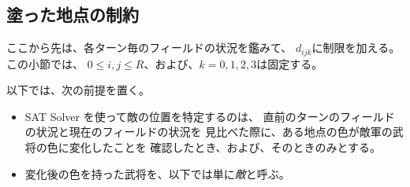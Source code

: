 \subsection{塗った地点の制約}

ここから先は、各ターン毎のフィールドの状況を鑑みて、
$d_{ijk}$に制限を加える。この小節では、
$0 \leq i, j \leq R$、および、$k = 0, 1, 2, 3$は固定する。

以下では、次の前提を置く。
\begin{itemize}
 \item SAT Solver を使って敵の位置を特定するのは、
       直前のターンのフィールドの状況と現在のフィールドの状況を
       見比べた際に、ある地点の色が敵軍の武将の色に変化したことを
       確認したとき、および、そのときのみとする。
 \item 変化後の色を持った武将を、以下では単に\emph{敵}と呼ぶ。
\end{itemize}

